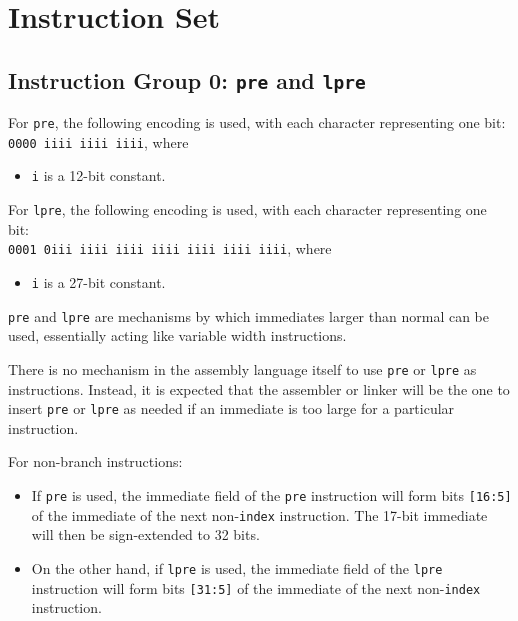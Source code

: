 \documentclass{article}
\begin{document}
	\newpage
	\section{Instruction Set}

	\subsection{Instruction Group 0: \texttt{pre} and \texttt{lpre}}
	For \texttt{pre}, the following encoding is used, with each character
	representing one bit: \\
	\texttt{0000 iiii iiii iiii}, where 
	
	\singlespacing
	\begin{itemize}
	\item \texttt{i} is a 12-bit constant.
	\end{itemize}

	For \texttt{lpre}, the following encoding is used, with each character
	representing one bit: \\
	\texttt{0001 0iii iiii iiii  iiii iiii iiii iiii}, where

	\singlespacing
	\begin{itemize}
	\item \texttt{i} is a 27-bit constant.
	\end{itemize}

	\texttt{pre} and \texttt{lpre} are mechanisms by which immediates
	larger than normal can be used, essentially acting like variable width
	instructions.

	There is no mechanism in the assembly language itself to use
	\texttt{pre} or \texttt{lpre} as instructions. Instead, it is expected
	that the assembler or linker will be the one to insert \texttt{pre} or
	\texttt{lpre} as needed if an immediate is too large for a particular
	instruction.

	For non-branch instructions:
	\begin{itemize}
	\item If \texttt{pre} is used, the immediate field of the
	\texttt{pre} instruction will form bits \texttt{[16:5]} of the
	immediate of the next non-\texttt{index} instruction. The 17-bit
	immediate will then be sign-extended to 32 bits.

	\item On the other hand, if \texttt{lpre} is used, the immediate
	field of the \texttt{lpre} instruction will form bits
	\texttt{[31:5]} of the immediate of the next non-\texttt{index}
	instruction.
	\end{itemize}
\end{document}
